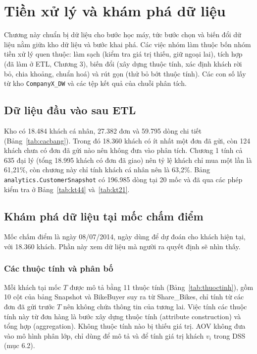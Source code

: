 \section{Tiền xử lý và khám phá dữ liệu}

Chương này chuẩn bị dữ liệu cho bước học máy, tức bước chọn và biến đổi dữ liệu nằm giữa kho dữ liệu và bước khai phá. Các việc nhóm làm thuộc bốn nhóm tiền xử lý quen thuộc: làm sạch (kiểm tra giá trị thiếu, giữ ngoại lai), tích hợp (đã làm ở ETL, Chương 3), biến đổi (xây dựng thuộc tính, xác định khách rời bỏ, chia khoảng, chuẩn hoá) và rút gọn (thử bỏ bớt thuộc tính). Các con số lấy từ kho \texttt{CompanyX\_DW} và các tệp kết quả của chuỗi phân tích.

\subsection{Dữ liệu đầu vào sau ETL}
Kho có 18.484 khách cá nhân, 27.382 đơn và 59.795 dòng chi tiết (Bảng~\ref{tab:cacbang}). Trong đó 18.360 khách có ít nhất một đơn đã gửi, còn 124 khách chưa có đơn đã gửi nào nên không đưa vào phân tích. Chương 1 tính cả 635 đại lý (tổng 18.995 khách có đơn đã giao) nên tỷ lệ khách chỉ mua một lần là 61,21\%, còn chương này chỉ tính khách cá nhân nên là 63,2\%. Bảng \texttt{analytics.\allowbreak CustomerSnapshot} có 196.985 dòng tại 20 mốc và đã qua các phép kiểm tra ở Bảng~\ref{tab:kt44} và~\ref{tab:kt21}.

\subsection{Khám phá dữ liệu tại mốc chấm điểm}
Mốc chấm điểm là ngày 08/07/2014, ngày dùng để dự đoán cho khách hiện tại, với 18.360 khách. Phần này xem dữ liệu mà người ra quyết định sẽ nhìn thấy.

\subsubsection{Các thuộc tính và phân bố}
Mỗi khách tại mốc $T$ được mô tả bằng 11 thuộc tính (Bảng~\ref{tab:thuoctinh}), gồm 10 cột của bảng Snapshot và BikeBuyer suy ra từ Share\_Bikes, chỉ tính từ các đơn đã gửi trước $T$ nên không chứa thông tin của tương lai. Việc tính các thuộc tính này từ đơn hàng là bước xây dựng thuộc tính (attribute construction) và tổng hợp (aggregation). Không thuộc tính nào bị thiếu giá trị. AOV không đưa vào mô hình phân lớp, chỉ dùng để mô tả và để tính giá trị khách $v_i$ trong DSS (mục 6.2).

